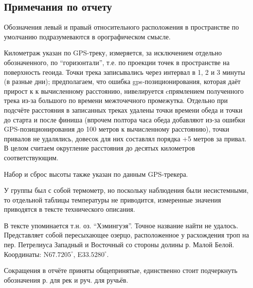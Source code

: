 \subsection{Примечания по отчету}
Обозначения левый и правый относительного расположения в пространстве по умолчанию подразумеваются в орографическом смысле.

Километраж указан по GPS-треку, измеряется, за исключением отдельно обозначенного, по ``горизонтали'',
т.е. по проекции точек в пространстве на поверхность геоида. Точки трека записывались через интервал в 1, 2 и 3 минуты
(в разные дни); предполагаем, что ошибка gps-позиционирования, которая даёт прирост к к вычисленному расстоянию,
нивелируется cпрямлением полученного трека из-за большого по времени межточечного промежутка.
Отдельно при подсчёте расстояния в записанных треках удалены точки времени обеда и точки до старта и после финиша
(впрочем полтора часа обеда добавляют из-за ошибки GPS-позиционирования до 100 метров к вычисленному расстоянию),
точки привалов не удалялись, довесок для них составлял порядка +5 метров за привал.
В целом считаем округление расстояния до десятых километров соответствующим.

Набор и сброс высоты также указан по данным GPS-трекера.

У группы был с собой термометр, но поскольку наблюдения были несистемными, то отдельной таблицы температуры не приводится,
измеренные значения приводятся в тексте технического описания.

В тексте упоминается т.н. оз. ``Хэмингуэя''. Точное название найти не удалось.
Представляет собой пересыхающее озерцо, расположенное у расхождения троп на пер. Петрелиуса Западный и Восточный со
стороны долины р. Малой Белой. Координаты: N$67.7205^{\circ}$, E$33.5280^{\circ}$.

Сокращения в отчёте приняты общепринятые, единственно стоит подчеркнуть обозначения р. для рек и руч. для ручьёв.
